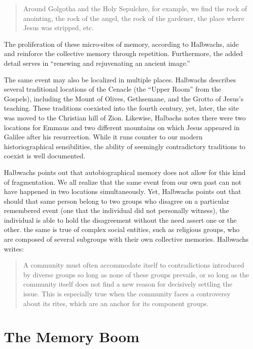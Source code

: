 \begin{quote}
Around Golgotha and the Holy Sepulchre, for example, we find the rock of
anointing, the rock of the angel, the rock of the gardener, the place
where Jesus was stripped, etc.\autocite[220]{halbwachs1992}
\end{quote}

The proliferation of these micro-sites of memory, according to
Halbwachs, aide and reinforce the collective memory through repetition.
Furthermore, the added detail serves in ``renewing and rejuvenating an
ancient image.''\autocite[220]{halbwachs1992}

The same event may also be localized in multiple places. Halbwachs
describes several traditional locations of the Cenacle (the ``Upper
Room'' from the Gospels), including the Mount of Olives, Gethsemane, and
the Grotto of Jesus's teaching. These traditions coexisted into the
fourth century, yet, later, the site was moved to the Christian hill of
Zion. Likewise, Halbachs notes there were two locations for Emmaus and
two different mountains on which Jesus appeared in Galilee after his
resurrection. While it runs counter to our modern historiographical
sensibilities, the ability of seemingly contradictory traditions to
coexist is well documented.

Halbwachs points out that autobiographical memory does not allow for
this kind of fragmentation. We all realize that the same event from our
own past can not have happened in two locations simultaneously. Yet,
Halbwachs points out that should that same person belong to two groups
who disagree on a particular remembered event (one that the individual
did not personally witness), the individual is able to hold the
disagreement without the need assert one or the other. the same is true
of complex social entities, such as religious groups, who are composed
of several subgroups with their own collective memories. Halbwachs
writes:

\begin{quote}
A community must often accommodate itself to contradictions introduced
by diverse groups so long as none of these groups prevails, or so long
as the community itself does not find a new reason for decisively
settling the issue. This is especially true when the community faces a
controversy about its rites, which are an anchor for its component
groups.\autocite[224]{halbwachs1992}
\end{quote}

\hypertarget{the-memory-boom}{%
\section{The Memory Boom}\label{the-memory-boom}}

